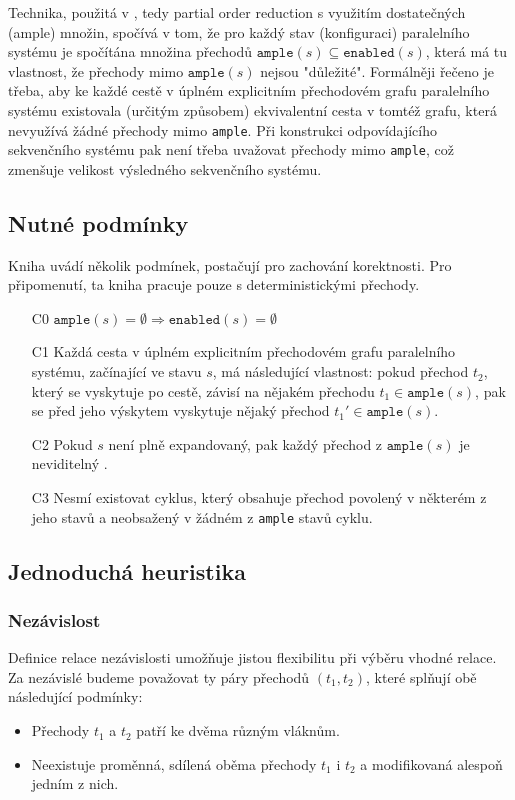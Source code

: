 \documentclass[10pt,a4paper,notitlepage]{report}
\begin{document}
Technika, použitá v \cite{CLARKE}, tedy partial order reduction s využitím dostatečných (ample) množin, spočívá v tom, že pro každý stav (konfiguraci) paralelního systému je spočítána množina přechodů $\texttt{ample}(s) \subseteq \texttt{enabled}(s)$, která má tu vlastnost, že přechody mimo $\texttt{ample}(s)$ nejsou "důležité". Formálněji řečeno je třeba, aby ke každé cestě v úplném explicitním přechodovém grafu paralelního systému existovala (určitým způsobem) ekvivalentní cesta v tomtéž grafu, která nevyužívá žádné přechody mimo \texttt{ample}. Při konstrukci odpovídajícího sekvenčního systému pak není třeba uvažovat přechody mimo \texttt{ample}, což zmenšuje velikost výsledného sekvenčního systému.

\subsection{Nutné podmínky}
Kniha \cite{CLARKE} uvádí několik podmínek, postačují pro zachování korektnosti. Pro připomenutí, ta kniha pracuje pouze s deterministickými přechody. 

\begin{enumerate}
\item[C0] $\texttt{ample}(s) = \emptyset \Rightarrow \texttt{enabled}(s) = \emptyset$
\item[C1] Každá cesta v úplném explicitním přechodovém grafu paralelního systému, začínající ve stavu $s$, má následující vlastnost: pokud přechod $t_2$, který se vyskytuje po cestě, závisí na nějakém přechodu $t_1 \in \texttt{ample}(s)$, pak se před jeho výskytem vyskytuje nějaký přechod $t_1' \in \texttt{ample}(s)$.
\item[C2] Pokud $s$ není plně expandovaný, pak každý přechod z $\texttt{ample}(s)$ je neviditelný .
\item[C3] Nesmí existovat cyklus, který obsahuje přechod povolený v některém z jeho stavů a neobsažený v žádném z \texttt{ample} stavů cyklu.
\end{enumerate}


\subsection{Jednoduchá heuristika}
\subsubsection{Nezávislost}
Definice relace nezávislosti umožňuje jistou flexibilitu při výběru vhodné relace. Za nezávislé budeme považovat ty páry přechodů $(t_1, t_2)$, které splňují obě následující podmínky:
\begin{itemize}
\item Přechody $t_1$ a $t_2$ patří ke dvěma různým vláknům.
\item Neexistuje proměnná, sdílená oběma přechody $t_1$ i $t_2$ a modifikovaná alespoň jedním z nich.
\end{itemize}
\end{document}
